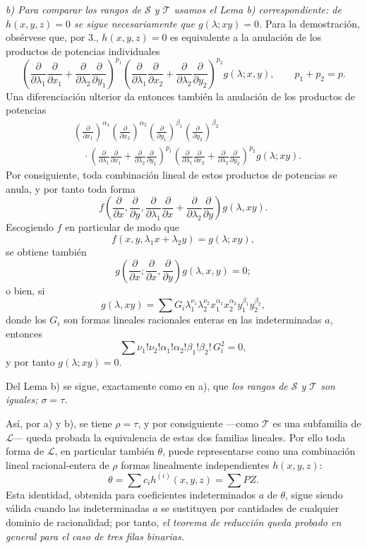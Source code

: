 \documentclass[11pt]{article}
\begin{document}
\emph{b) Para comparar los rangos de $\mathcal S$ y $\mathcal T$ usamos el Lema b) correspondiente: de $h(x,y,z)=0$ se sigue necesariamente que $g(\lambda;xy)=0$.} Para la demostración, obsérvese que, por 3., $h(x,y,z)=0$ es equivalente a la anulación de los productos de potencias individuales
\[
 \left(\frac{\partial}{\partial\lambda_1}\frac{\partial}{\partial x_1}
 +\frac{\partial}{\partial\lambda_2}\frac{\partial}{\partial y_1}\right)^{p_1}
 \left(\frac{\partial}{\partial\lambda_1}\frac{\partial}{\partial x_2}
 +\frac{\partial}{\partial\lambda_2}\frac{\partial}{\partial y_2}\right)^{p_2}g(\lambda;x,y),
 \qquad p_1+p_2=p.
\]
Una diferenciación ulterior da entonces también la anulación de los productos de potencias
\[
\begin{aligned}
&\left(\frac{\partial}{\partial x_1}\right)^{\alpha_1}
 \left(\frac{\partial}{\partial x_2}\right)^{\alpha_2}
 \left(\frac{\partial}{\partial y_1}\right)^{\beta_1}
 \left(\frac{\partial}{\partial y_2}\right)^{\beta_2} \\
&\quad\cdot
 \left(\frac{\partial}{\partial\lambda_1}\frac{\partial}{\partial x_1}
 +\frac{\partial}{\partial\lambda_2}\frac{\partial}{\partial y_1}\right)^{p_1}
 \left(\frac{\partial}{\partial\lambda_1}\frac{\partial}{\partial x_2}
 +\frac{\partial}{\partial\lambda_2}\frac{\partial}{\partial y_2}\right)^{p_2}
 g(\lambda;xy).
\end{aligned}
\]
Por consiguiente, toda combinación lineal de estos productos de potencias se anula, y por tanto toda forma
\[
  f\left(\frac{\partial}{\partial x},\frac{\partial}{\partial y},
  \frac{\partial}{\partial\lambda_1}\frac{\partial}{\partial x}
  +\frac{\partial}{\partial\lambda_2}\frac{\partial}{\partial y}\right)g(\lambda,xy).
\]
Escogiendo $f$ en particular de modo que
\[
  f(x,y,\lambda_1x+\lambda_2y)=g(\lambda;xy),
\]
se obtiene también
\[
  g\left(\frac{\partial}{\partial x};
    \frac{\partial}{\partial x},
    \frac{\partial}{\partial y}\right)g(\lambda,x,y)=0;
\]
o bien, si
\[
  g(\lambda,xy)=\sum G_i\lambda_1^{\nu_1}\lambda_2^{\nu_2}
  x_1^{\alpha_1}x_2^{\alpha_2}y_1^{\beta_1}y_2^{\beta_2},
\]
donde los $G_i$ son formas lineales racionales enteras en las indeterminadas $a$, entonces
\[
  \sum \nu_1!\nu_2!\alpha_1!\alpha_2!\beta_1!\beta_2!\,G_i^2=0,
\]
y por tanto $g(\lambda;xy)=0$.

Del Lema b) se sigue, exactamente como en a), que \emph{los rangos de $\mathcal S$ y $\mathcal T$ son iguales; $\sigma=\tau$.}

Así, por a) y b), se tiene $\rho=\tau$, y por consiguiente ---como $\mathcal T$ es una subfamilia de $\mathcal L$--- queda probada la equivalencia de estas dos familias lineales. Por ello toda forma de $\mathcal L$, en particular también $\theta$, puede representarse como una combinación lineal racional-entera de $\rho$ formas linealmente independientes $h(x,y,z)$:
\[
  \theta=\sum c_i h^{(i)}(x,y,z)=\sum PZ.
\]
Esta identidad, obtenida para coeficientes indeterminados $a$ de $\theta$, sigue siendo válida cuando las indeterminadas $a$ se sustituyen por cantidades de cualquier dominio de racionalidad; por tanto, \emph{el teorema de reducción queda probado en general para el caso de tres filas binarias.}
\end{document}
